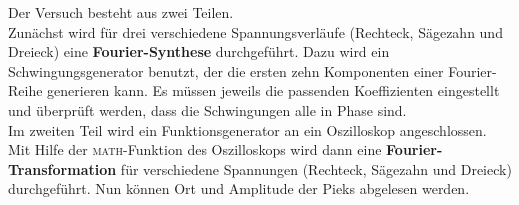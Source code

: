 Der Versuch besteht aus zwei Teilen. \\
Zunächst wird für drei verschiedene Spannungsverläufe (Rechteck, Sägezahn und Dreieck) eine \textbf{Fourier-Synthese} durchgeführt. Dazu wird ein Schwingungsgenerator benutzt, der die ersten zehn Komponenten einer Fourier-Reihe generieren kann. Es müssen jeweils die passenden Koeffizienten eingestellt und überprüft werden, dass die Schwingungen alle in Phase sind. \\
Im zweiten Teil wird ein Funktionsgenerator an ein Oszilloskop angeschlossen. Mit Hilfe der \textsc{math}-Funktion des Oszilloskops wird dann eine \textbf{Fourier-Transformation} für verschiedene Spannungen (Rechteck, Sägezahn und Dreieck) durchgeführt. Nun können Ort und Amplitude der Pieks abgelesen werden.